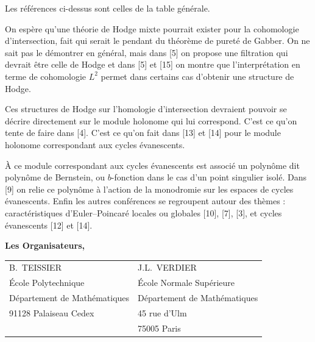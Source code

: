 \documentclass[12pt,a4paper]{article}
\theoremstyle{plain}
\theoremstyle{definition}
\theoremstyle{remark}
\begin{document}
Les références ci-dessus sont celles de la table générale.
\newpage

\thispagestyle{empty}
\noindent
On espère qu'une théorie de Hodge mixte pourrait exister pour la cohomologie d'intersection, fait qui serait le pendant du théorème de pureté de Gabber. On ne sait pas le démontrer en général, mais dans [5] on propose une filtration qui devrait être celle de Hodge et dans [5] et [15] on montre que l'interprétation en terme de cohomologie $L^{2}$ permet dans certains cas d'obtenir une structure de Hodge.

Ces structures de Hodge sur l'homologie d'intersection devraient pouvoir se décrire directement sur le module holonome qui lui correspond. C'est ce qu'on tente de faire dans [4]. C'est ce qu'on fait dans [13] et [14] pour le module holonome correspondant aux cycles évanescents.

À ce module correspondant aux cycles évanescents est associé un polynôme dit polynôme de Bernstein, ou $b$-fonction dans le cas d'un point singulier isolé. Dans [9] on relie ce polynôme à l'action de la monodromie sur les espaces de cycles évanescents. Enfin les autres conférences se regroupent autour des thèmes : caractéristiques d'Euler--Poincaré locales ou globales [10], [7], [3], et cycles évanescents [12] et [14].

\vspace{1cm}
\begin{flushright}
\textbf{Les Organisateurs,}
\end{flushright}

\vspace{0.5cm}
\begin{center}
\begin{tabular}{ll}
B.~TEISSIER & J.L.~VERDIER \\
\'Ecole Polytechnique & \'Ecole Normale Supérieure \\
Département de Mathématiques & Département de Mathématiques \\
91128 Palaiseau Cedex & 45 rue d'Ulm \\
 & 75005 Paris
\end{tabular}
\end{center}
\newpage

\thispagestyle{empty}
\end{document}
